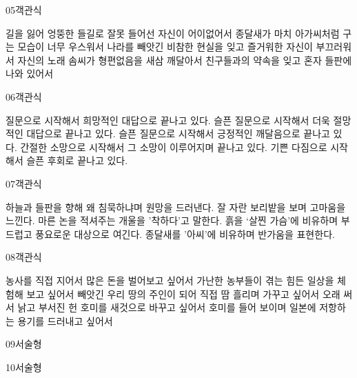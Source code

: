 \documentclass[fs85,seriesRus]{korfarm-base}
\begin{document}
\begin{kfQBlock}{05}{객관식}
\begin{kfChoices}
\kfChoice 길을 잃어 엉뚱한 들길로 잘못 들어선 자신이 어이없어서
\kfChoice 종달새가 마치 아가씨처럼 구는 모습이 너무 우스워서
\kfChoice 나라를 빼앗긴 비참한 현실을 잊고 즐거워한 자신이 부끄러워서
\kfChoice 자신의 노래 솜씨가 형편없음을 새삼 깨달아서
\kfChoice 친구들과의 약속을 잊고 혼자 들판에 나와 있어서
\end{kfChoices}
\end{kfQBlock}
\begin{kfQBlock}{06}{객관식}
\begin{kfChoices}
\kfChoice 질문으로 시작해서 희망적인 대답으로 끝나고 있다.
\kfChoice 슬픈 질문으로 시작해서 더욱 절망적인 대답으로 끝나고 있다.
\kfChoice 슬픈 질문으로 시작해서 긍정적인 깨달음으로 끝나고 있다.
\kfChoice 간절한 소망으로 시작해서 그 소망이 이루어지며 끝나고 있다.
\kfChoice 기쁜 다짐으로 시작해서 슬픈 후회로 끝나고 있다.
\end{kfChoices}
\end{kfQBlock}
\begin{kfQBlock}{07}{객관식}
\begin{kfChoices}
\kfChoice 하늘과 들판을 향해 왜 침묵하냐며 원망을 드러낸다.
\kfChoice 잘 자란 보리밭을 보며 고마움을 느낀다.
\kfChoice 마른 논을 적셔주는 개울을 '착하다'고 말한다.
\kfChoice 흙을 ‘살찐 가슴’에 비유하며 부드럽고 풍요로운 대상으로 여긴다.
\kfChoice 종달새를 '아씨'에 비유하며 반가움을 표현한다.
\end{kfChoices}
\end{kfQBlock}
\begin{kfQBlock}{08}{객관식}
\begin{kfChoices}
\kfChoice 농사를 직접 지어서 많은 돈을 벌어보고 싶어서
\kfChoice 가난한 농부들이 겪는 힘든 일상을 체험해 보고 싶어서
\kfChoice 빼앗긴 우리 땅의 주인이 되어 직접 땀 흘리며 가꾸고 싶어서
\kfChoice 오래 써서 낡고 부서진 헌 호미를 새것으로 바꾸고 싶어서
\kfChoice 호미를 들어 보이며 일본에 저항하는 용기를 드러내고 싶어서
\end{kfChoices}
\end{kfQBlock}
\begin{kfQBlock}{09}{서술형}
\end{kfQBlock}
\begin{kfQBlock}{10}{서술형}
\end{kfQBlock}
\kfEndMC
\end{document}
